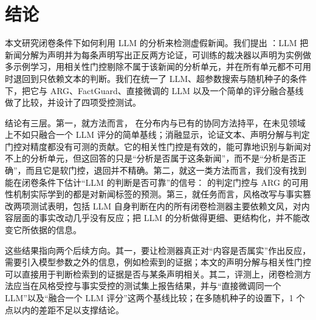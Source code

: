 \section{结论}\label{sec:conclusion}

本文研究闭卷条件下如何利用 LLM 的分析来检测虚假新闻。我们提出 \method{}：LLM 把新闻分解为声明并为每条声明写出正反两方论证，可训练的裁决器以声明为实例做多示例学习，用相关性门控剔除不属于该新闻的分析单元，并在所有单元都不可用时退回到只依赖文本的判断。我们在统一了 LLM、超参数搜索与随机种子的条件下，把它与 ARG、FactGuard、直接微调的 LLM 以及一个简单的评分融合基线做了比较，并设计了四项受控测试。

结论有三层。第一，就方法而言，\method{} 在分布内与已有的协同方法持平，在未见领域上不如只融合一个 LLM 评分的简单基线；消融显示，论证文本、声明分解与判定门控对精度都没有可测的贡献。它的相关性门控是有效的，能可靠地识别与新闻对不上的分析单元，但这回答的只是“分析是否属于这条新闻”，而不是“分析是否正确”，而且它是软门控，退回并不精确。第二，就这一类方法而言，我们没有找到能在闭卷条件下估计“LLM 的判断是否可靠”的信号：\method{} 的判定门控与 ARG 的可用性机制实际学到的都是对新闻标签的预测。第三，就任务而言，风格改写与事实篡改两项测试表明，包括 LLM 自身判断在内的所有闭卷检测器主要依赖文风，对内容层面的事实改动几乎没有反应；把 LLM 的分析做得更细、更结构化，并不能改变它所依据的信息。

这些结果指向两个后续方向。其一，要让检测器真正对“内容是否属实”作出反应，需要引入模型参数之外的信息，例如检索到的证据；本文的声明分解与相关性门控可以直接用于判断检索到的证据是否与某条声明相关。其二，评测上，闭卷检测方法应当在风格受控与事实受控的测试集上报告结果，并与“直接微调同一个 LLM”以及“融合一个 LLM 评分”这两个基线比较；在多随机种子的设置下，1 个点以内的差距不足以支撑结论。
